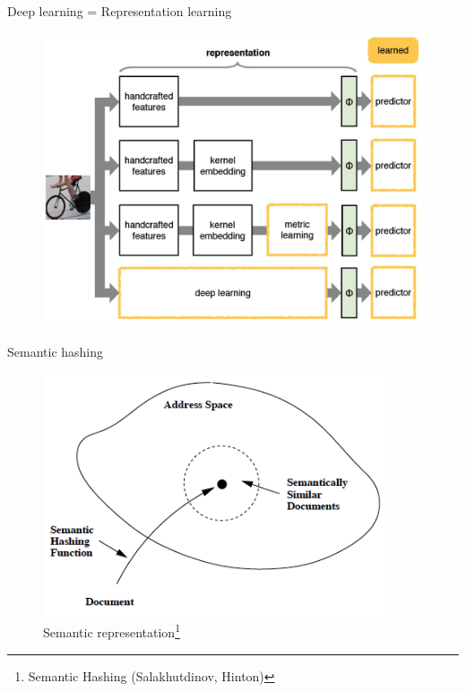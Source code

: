\documentclass{beamer}
\begin{document}
\begin{frame}{Deep learning = Representation learning}

\begin{figure}[h!]
  \centering
  \includegraphics[width=1\textwidth]{images/ife.png}
\end{figure}

\end{frame}



\begin{frame}{Semantic hashing}

\begin{figure}[h!]
  \centering
  \includegraphics[width=0.9\textwidth]{images/sh_schema.png}
  \caption{Semantic representation\footnote{Semantic Hashing (Salakhutdinov, Hinton)}}
\end{figure}

\end{frame}
\end{document}
